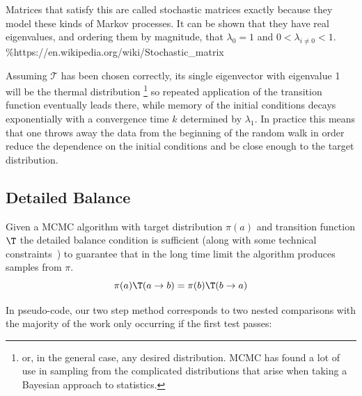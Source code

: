 Matrices that satisfy this are called stochastic matrices exactly because they model these kinds of Markov processes. It can be shown that they have real eigenvalues, and ordering them by magnitude, that \(\lambda_0 = 1\) and \(0 < \lambda_{i\neq0} < 1\). \%https://en.wikipedia.org/wiki/Stochastic\_matrix

Assuming \(\mathcal{T}\) has been chosen correctly, its single eigenvector with eigenvalue 1 will be the thermal distribution \footnote{or, in the general case, any desired distribution. MCMC has found a lot of use in sampling from the complicated distributions that arise when taking a Bayesian approach to statistics.} so repeated application of the transition function eventually leads there, while memory of the initial conditions decays exponentially with a convergence time \(k\) determined by \(\lambda_1\). In practice this means that one throws away the data from the beginning of the random walk in order reduce the dependence on the initial conditions and be close enough to the target distribution.

\hypertarget{detailed-balance}{%
\subsection{Detailed Balance}\label{detailed-balance}}

Given a MCMC algorithm with target distribution \(\pi(a)\) and transition function \(\T\) the detailed balance condition is sufficient (along with some technical constraints~\autocite{wolffMonteCarloErrors2004}) to guarantee that in the long time limit the algorithm produces samples from \(\pi\). \[\pi(a)\T(a \to b) = \pi(b)\T(b \to a)\]

In pseudo-code, our two step method corresponds to two nested comparisons with the majority of the work only occurring if the first test passes:

